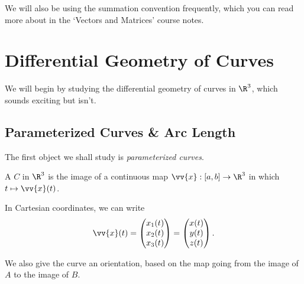 We will also be using the summation convention frequently, which you can read more about in the `Vectors and Matrices' course notes.

\section{Differential Geometry of Curves}

We will begin by studying the differential geometry of curves in $\R^3$, which sounds exciting but isn't.

\subsection{Parameterized Curves \& Arc Length}

The first object we shall study is \emph{parameterized curves}.

\begin{definition}
	A  $C$ in $\R^3$ is the image of a continuous map $\vv{x} : [a, b] \rightarrow \R^3$ in which $t \mapsto \vv{x}(t)$.
\end{definition}

In Cartesian coordinates, we can write
$$
\vv{x}(t) = \begin{pmatrix}
	x_1 (t) \\
	x_2 (t) \\
	x_3(t)
\end{pmatrix} = \begin{pmatrix}
	x (t) \\
	y (t) \\
	z (t)
\end{pmatrix}.
$$

We also give the curve an orientation, based on the map going from the image of $A$ to the image of $B$.

